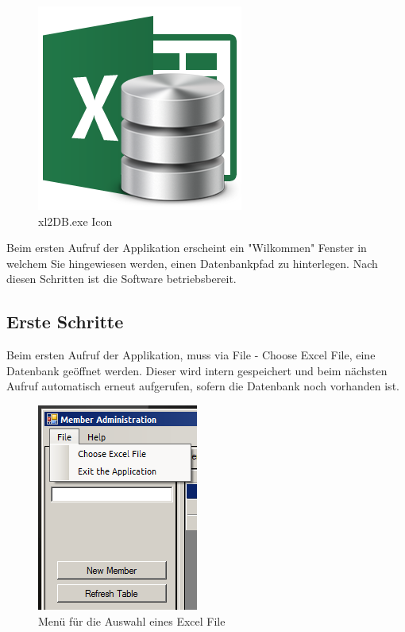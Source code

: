 \documentclass{article}
\begin{document}
\begin{figure}[h]
	\begin{center}
		\centering
		\includegraphics[width=0.1\paperwidth]{Icon}
		\caption{xl2DB.exe Icon}
	\end{center}
\end{figure}

Beim ersten Aufruf der Applikation erscheint ein "Wilkommen" Fenster in welchem Sie hingewiesen werden, einen Datenbankpfad zu hinterlegen. Nach diesen Schritten ist die Software betriebsbereit.

\newpage

\subsection*{Erste Schritte}
Beim ersten Aufruf der Applikation, muss via File - Choose Excel File, eine Datenbank geöffnet werden. Dieser wird intern gespeichert und beim nächsten Aufruf automatisch erneut aufgerufen, sofern die Datenbank noch vorhanden ist.

\begin{figure}[h]
	\begin{center}
		\includegraphics[width=0.2\paperwidth]{Pfads}
		\caption{Menü für die Auswahl eines Excel File}
	\end{center}
\end{figure}
\end{document}
